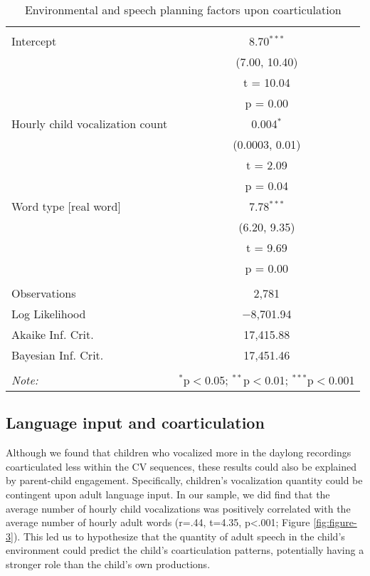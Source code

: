 \documentclass[a4paper,man,natbib,donotrepeattitle, apacite]{apa6}
\begin{document}
\begin{table}[!htbp] \centering 
  \caption{Environmental and speech planning factors upon coarticulation} 
  \label{tab:model-2} 
\begin{tabular}{@{\extracolsep{5pt}}lc} 
\\[-1.8ex]\hline 
\hline \\[-1.8ex] 
 Intercept & 8.70$^{***}$ \\ 
  & (7.00, 10.40) \\ 
  & t = 10.04 \\ 
  & p = 0.00 \\ 
  Hourly child vocalization count & 0.004$^{*}$ \\ 
  & (0.0003, 0.01) \\ 
  & t = 2.09 \\ 
  & p = 0.04 \\ 
  Word type [real word] & 7.78$^{***}$ \\ 
  & (6.20, 9.35) \\ 
  & t = 9.69 \\ 
  & p = 0.00 \\ 
 \hline \\[-1.8ex] 
Observations & 2,781 \\ 
Log Likelihood & $-$8,701.94 \\ 
Akaike Inf. Crit. & 17,415.88 \\ 
Bayesian Inf. Crit. & 17,451.46 \\ 
\hline 
\hline \\[-1.8ex] 
\textit{Note:}  & \multicolumn{1}{r}{$^{*}$p$<$0.05; $^{**}$p$<$0.01; $^{***}$p$<$0.001} \\ 
\end{tabular} 
\end{table} 


\subsection{Language input and coarticulation}

Although we found that children who vocalized more in the daylong recordings coarticulated less within the CV sequences, these results could also be explained by parent-child engagement. Specifically, children’s vocalization quantity could be contingent upon adult language input. In our sample, we did find that the average number of hourly child vocalizations was positively correlated with the average number of hourly adult words (r=.44, t=4.35, p<.001; Figure \ref{fig:figure-3}). This led us to hypothesize that the quantity of adult speech in the child’s environment could predict the child’s coarticulation patterns, potentially having a stronger role than the child’s own productions. 
\end{document}
